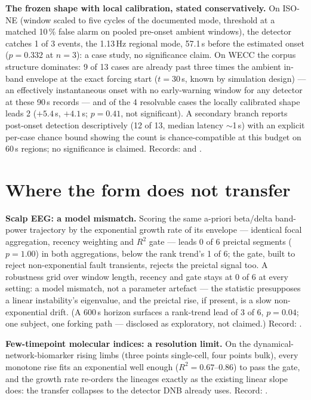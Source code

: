 \documentclass[aip,cha,preprint,amsmath,amssymb]{revtex4-2}
\begin{document}
\textbf{The frozen shape with local calibration, stated
conservatively.} On ISO-NE (window scaled to five cycles of the
documented mode, threshold at a matched 10\,\% false alarm on pooled
pre-onset ambient windows), the detector catches 1 of 3 events, the
1.13\,Hz regional mode, 57.1\,s before the estimated onset
($p = 0.332$ at $n = 3$): a case study, no significance claim. On WECC
the corpus structure dominates: 9 of 13 cases are already past three
times the ambient in-band envelope at the exact forcing start
($t = 30$\,s, known by simulation design) --- an effectively
instantaneous onset with no early-warning window for any detector at
these 90\,s records --- and of the 4 resolvable cases the locally
calibrated shape leads 2 ($+5.4$\,s, $+4.1$\,s; $p = 0.41$, not
significant). A secondary branch reports post-onset detection
descriptively (12 of 13, median latency $\sim$1\,s) with an explicit
per-case chance bound showing the count is chance-compatible at this
budget on 60\,s regions; no significance is claimed. Records:
 and
.

\section{Where the form does not transfer}\label{sec:boundaries}

\textbf{Scalp EEG: a model mismatch.} Scoring the same a-priori
beta/delta band-power trajectory by the exponential growth rate of its
envelope --- identical focal aggregation, recency weighting and $R^2$
gate --- leads 0 of 6 preictal segments ($p = 1.00$) in both
aggregations, below the rank trend's 1 of 6; the gate, built to reject
non-exponential fault transients, rejects the preictal signal too. A
robustness grid over window length, recency and gate stays at 0 of 6 at
every setting: a model mismatch, not a parameter artefact --- the
statistic presupposes a linear instability's eigenvalue, and the
preictal rise, if present, is a slow non-exponential drift. (A 600\,s
horizon surfaces a rank-trend lead of 3 of 6, $p = 0.04$; one subject,
one forking path --- disclosed as exploratory, not claimed.) Record:
.

\textbf{Few-timepoint molecular indices: a resolution limit.} On the
dynamical-network-biomarker rising limbs (three points single-cell,
four points bulk), every monotone rise fits an exponential well enough
($R^2 = 0.67$--$0.86$) to pass the gate, and the growth rate re-orders
the lineages exactly as the existing linear slope does: the transfer
collapses to the detector DNB already uses. Record:
.
\end{document}
